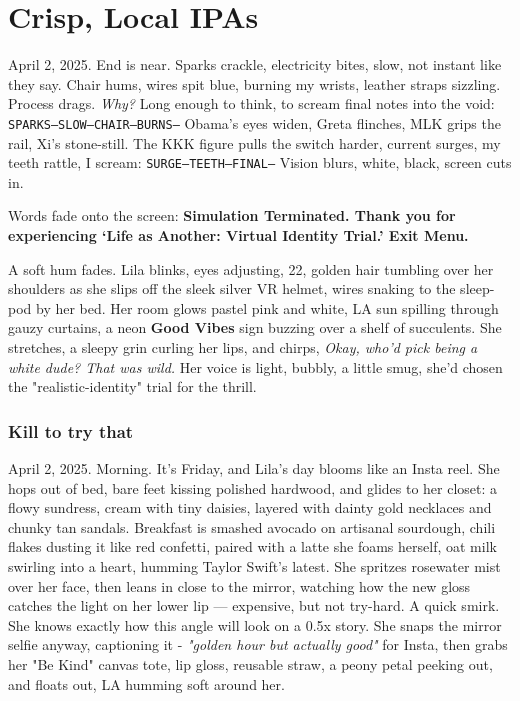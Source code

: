 \documentclass[12pt,oneside]{book}
\newcommand{\note}[1]{\texttt{#1}}
\begin{document}
\chapter{Crisp, Local IPAs}

April 2, 2025. End is near. Sparks crackle, electricity bites, slow, not instant like they say. Chair hums, wires spit blue, burning my wrists, leather straps sizzling. Process drags. \textit{Why?} Long enough to think, to scream final notes into the void: \note{SPARKS—SLOW—CHAIR—BURNS—} Obama’s eyes widen, Greta flinches, MLK grips the rail, Xi’s stone-still. The KKK figure pulls the switch harder, current surges, my teeth rattle, I scream: \note{SURGE—TEETH—FINAL—} Vision blurs, white, black, screen cuts in.

Words fade onto the screen: \textbf{Simulation Terminated. Thank you for experiencing ‘Life as Another: Virtual Identity Trial.’ Exit Menu.}

A soft hum fades. Lila blinks, eyes adjusting, 22, golden hair tumbling over her shoulders as she slips off the sleek silver VR helmet, wires snaking to the sleep-pod by her bed. Her room glows pastel pink and white, LA sun spilling through gauzy curtains, a neon \textbf{Good Vibes} sign buzzing over a shelf of succulents. She stretches, a sleepy grin curling her lips, and chirps, \textit{Okay, who’d pick being a white dude? That was wild.} Her voice is light, bubbly, a little smug, she’d chosen the "realistic-identity" trial for the thrill.

\subsection*{Kill to try that}

April 2, 2025. Morning. It’s Friday, and Lila’s day blooms like an Insta reel. She hops out of bed, bare feet kissing polished hardwood, and glides to her closet: a flowy sundress, cream with tiny daisies, layered with dainty gold necklaces and chunky tan sandals. Breakfast is smashed avocado on artisanal sourdough, chili flakes dusting it like red confetti, paired with a latte she foams herself, oat milk swirling into a heart, humming Taylor Swift’s latest. She spritzes rosewater mist over her face, then leans in close to the mirror, watching how the new gloss catches the light on her lower lip — expensive, but not try-hard. A quick smirk. She knows exactly how this angle will look on a 0.5x story. She snaps the mirror selfie anyway, captioning it - \textit{"golden hour but actually good"} for Insta, then grabs her "Be Kind" canvas tote, lip gloss, reusable straw, a peony petal peeking out, and floats out, LA humming soft around her.
\end{document}
